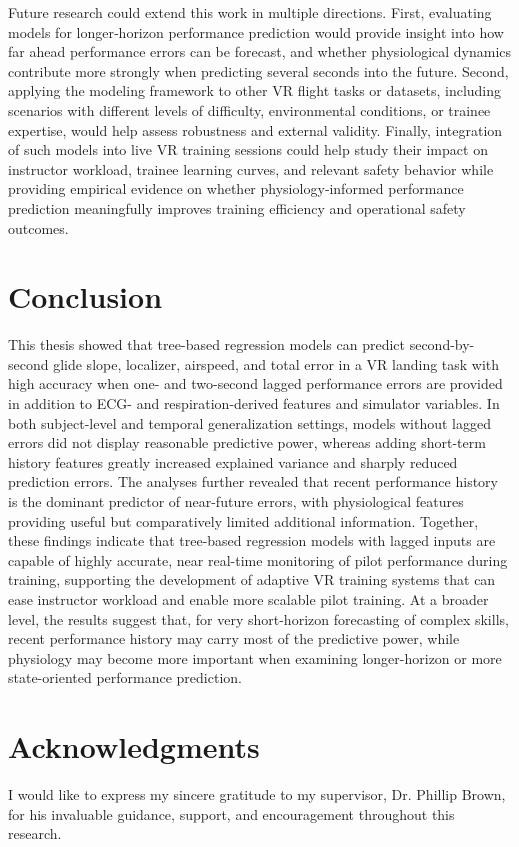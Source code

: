 \documentclass[11pt, a4paper]{article}
\begin{document}
Future research could extend this work in multiple directions. First, evaluating models for longer‑horizon performance prediction would provide insight into how far ahead performance errors can be forecast, and whether physiological dynamics contribute more strongly when predicting several seconds into the future. Second, applying the modeling framework to other VR flight tasks or datasets, including scenarios with different levels of difficulty, environmental conditions, or trainee expertise, would help assess robustness and external validity. Finally, integration of such models into live VR training sessions could help study their impact on instructor workload, trainee learning curves, and relevant safety behavior while providing empirical evidence on whether physiology‑informed performance prediction meaningfully improves training efficiency and operational safety outcomes.


\section{Conclusion}
This thesis showed that tree-based regression models can predict second-by-second glide slope, localizer, airspeed, and total error in a VR landing task with high accuracy when one- and two-second lagged performance errors are provided in addition to ECG- and respiration-derived features and simulator variables. In both subject-level and temporal generalization settings, models without lagged errors did not display reasonable predictive power, whereas adding short-term history features greatly increased explained variance and sharply reduced prediction errors. The analyses further revealed that recent performance history is the dominant predictor of near-future errors, with physiological features providing useful but comparatively limited additional information. Together, these findings indicate that tree-based regression models with lagged inputs are capable of highly accurate, near real-time monitoring of pilot performance during training, supporting the development of adaptive VR training systems that can ease instructor workload and enable more scalable pilot training. At a broader level, the results suggest that, for very short-horizon forecasting of complex skills, recent performance history may carry most of the predictive power, while physiology may become more important when examining longer-horizon or more state-oriented performance prediction.

\section*{Acknowledgments}
I would like to express my sincere gratitude to my supervisor, Dr. Phillip Brown, for his invaluable guidance, support, and encouragement throughout this research.
\end{document}
